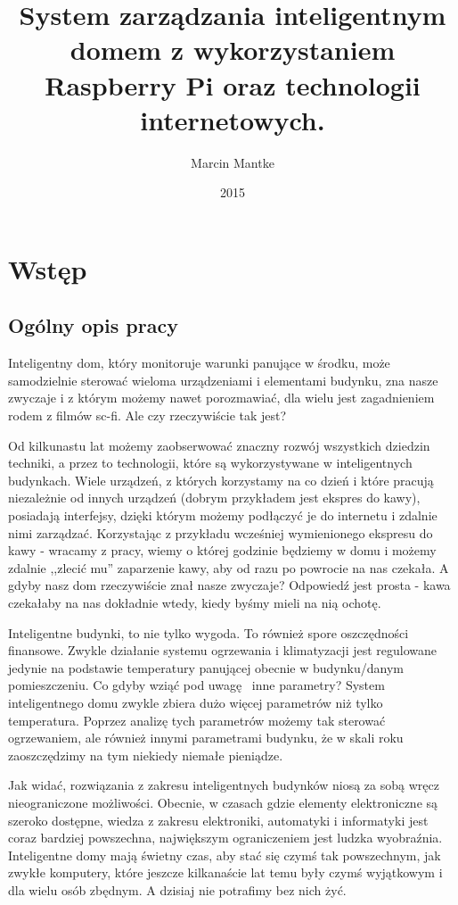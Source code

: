 \documentclass[eng,oneside]{mgr}
\author{Marcin Mantke}
\title{System zarządzania inteligentnym domem z wykorzystaniem Raspberry Pi oraz technologii internetowych.}
\date{2015}
\begin{document}
\maketitle
\tableofcontents
\chapter{Wstęp}
\section{Ogólny opis pracy}
Inteligentny dom, który monitoruje warunki panujące w środku, może samodzielnie sterować wieloma urządzeniami i elementami budynku, zna nasze zwyczaje i z którym możemy nawet porozmawiać, dla wielu jest zagadnieniem rodem z filmów sc-fi. Ale czy rzeczywiście tak jest? 

Od kilkunastu lat możemy zaobserwować znaczny rozwój wszystkich dziedzin techniki, a przez to technologii, które są wykorzystywane w inteligentnych budynkach. Wiele urządzeń, z których korzystamy na co dzień i które pracują niezależnie od innych urządzeń (dobrym przykładem jest ekspres do kawy), posiadają interfejsy, dzięki którym możemy podłączyć je do internetu i zdalnie nimi zarządzać. Korzystając z przykładu wcześniej wymienionego ekspresu do kawy - wracamy z pracy, wiemy o której godzinie będziemy w domu i możemy zdalnie ,,zlecić mu'' zaparzenie kawy, aby od razu po powrocie na nas czekała. A gdyby nasz dom rzeczywiście znał nasze zwyczaje? Odpowiedź jest prosta - kawa czekałaby na nas dokładnie wtedy, kiedy byśmy mieli na nią ochotę.

Inteligentne budynki, to nie tylko wygoda. To również spore oszczędności finansowe. Zwykle działanie systemu ogrzewania i klimatyzacji jest regulowane jedynie na podstawie temperatury panującej obecnie w budynku/danym pomieszczeniu. Co gdyby wziąć pod uwagę  inne parametry? System inteligentnego domu zwykle zbiera dużo więcej parametrów niż tylko temperatura. Poprzez analizę tych parametrów możemy tak sterować ogrzewaniem, ale również innymi parametrami budynku, że w skali roku zaoszczędzimy na tym niekiedy niemałe pieniądze.

Jak widać, rozwiązania z zakresu inteligentnych budynków niosą za sobą wręcz nieograniczone możliwości. Obecnie, w czasach gdzie elementy elektroniczne są szeroko dostępne, wiedza z zakresu elektroniki, automatyki i informatyki jest coraz bardziej powszechna, największym ograniczeniem jest ludzka wyobraźnia. Inteligentne domy mają świetny czas, aby stać się czymś tak powszechnym, jak zwykłe komputery, które jeszcze kilkanaście lat temu były czymś wyjątkowym i dla wielu osób zbędnym. A dzisiaj nie potrafimy bez nich żyć.
\end{document}
